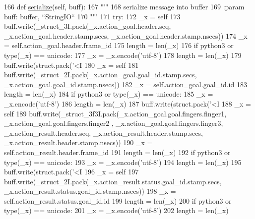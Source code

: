\begin{DoxyCode}
166   \textcolor{keyword}{def }\hyperlink{classjaco__msgs_1_1msg_1_1__SetFingersPositionAction_1_1SetFingersPositionAction_a2e8ac18e59483a94b53109eb9c0b022e}{serialize}(self, buff):
167     \textcolor{stringliteral}{"""}
168 \textcolor{stringliteral}{    serialize message into buffer}
169 \textcolor{stringliteral}{    :param buff: buffer, ``StringIO``}
170 \textcolor{stringliteral}{    """}
171     \textcolor{keywordflow}{try}:
172       \_x = self
173       buff.write(\_struct\_3I.pack(\_x.action\_goal.header.seq, \_x.action\_goal.header.stamp.secs, 
      \_x.action\_goal.header.stamp.nsecs))
174       \_x = self.action\_goal.header.frame\_id
175       length = len(\_x)
176       \textcolor{keywordflow}{if} python3 \textcolor{keywordflow}{or} type(\_x) == unicode:
177         \_x = \_x.encode(\textcolor{stringliteral}{'utf-8'})
178         length = len(\_x)
179       buff.write(struct.pack(\textcolor{stringliteral}{'<I%
180       \_x = self
181       buff.write(\_struct\_2I.pack(\_x.action\_goal.goal\_id.stamp.secs, \_x.action\_goal.goal\_id.stamp.nsecs))
182       \_x = self.action\_goal.goal\_id.id
183       length = len(\_x)
184       \textcolor{keywordflow}{if} python3 \textcolor{keywordflow}{or} type(\_x) == unicode:
185         \_x = \_x.encode(\textcolor{stringliteral}{'utf-8'})
186         length = len(\_x)
187       buff.write(struct.pack(\textcolor{stringliteral}{'<I%
188       \_x = self
189       buff.write(\_struct\_3f3I.pack(\_x.action\_goal.goal.fingers.finger1, \_x.action\_goal.goal.fingers.finger2
      , \_x.action\_goal.goal.fingers.finger3, \_x.action\_result.header.seq, \_x.action\_result.header.stamp.secs, 
      \_x.action\_result.header.stamp.nsecs))
190       \_x = self.action\_result.header.frame\_id
191       length = len(\_x)
192       \textcolor{keywordflow}{if} python3 \textcolor{keywordflow}{or} type(\_x) == unicode:
193         \_x = \_x.encode(\textcolor{stringliteral}{'utf-8'})
194         length = len(\_x)
195       buff.write(struct.pack(\textcolor{stringliteral}{'<I%
196       \_x = self
197       buff.write(\_struct\_2I.pack(\_x.action\_result.status.goal\_id.stamp.secs, 
      \_x.action\_result.status.goal\_id.stamp.nsecs))
198       \_x = self.action\_result.status.goal\_id.id
199       length = len(\_x)
200       \textcolor{keywordflow}{if} python3 \textcolor{keywordflow}{or} type(\_x) == unicode:
201         \_x = \_x.encode(\textcolor{stringliteral}{'utf-8'})
202         length = len(\_x)
}}}
\end{DoxyCode}
